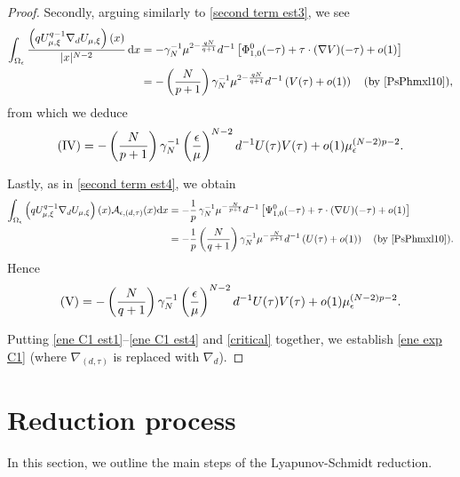 \documentclass[reqno]{amsart}
\theoremstyle{remark}
\newcommand{\ep}{\epsilon}
\newcommand{\ga}{\gamma}
\newcommand{\mca}{\mathcal{A}}
\newcommand{\dx}{\textup{d}x}
\newcommand{\mx}{{\mu,\xi}}
\renewcommand{\(}{\left(}
\renewcommand{\)}{\right)}
\numberwithin{equation}{section}
\begin{document}
\begin{proof}
Secondly, arguing similarly to \eqref{second term est3}, we see
\begin{align*}
\int_{\Omega_\ep} \frac{\(qU_\mx^{q-1}\nabla_d U_\mx\)(x)}{|x|^{N-2}}\, \dx &= -\ga_N^{-1} \mu^{2-\frac{qN}{q+1}} d^{-1} \left[\Phi_{1,0}^0(-\tau) + \tau \cdot (\nabla V)(-\tau) + o(1)\right] \\
&= -\(\frac{N}{p+1}\) \ga_N^{-1} \mu^{2-\frac{qN}{q+1}} d^{-1}\(V(\tau)+o(1)\) \quad (\textup{by \eqref{PsPhmxl10}}),
\end{align*}
from which we deduce
\begin{equation}\label{ene C1 est3}
\textup{(IV)} = -\(\frac{N}{p+1}\) \ga_N^{-1} \(\frac{\ep}{\mu}\)^{N-2} d^{-1} U(\tau)V(\tau) + o(1)\mu_\ep^{(N-2)p-2}.
\end{equation}

Lastly, as in \eqref{second term est4}, we obtain
\begin{align*}
\int_{\Omega_\ep} \(qU_\mx^{q-1}\nabla_d U_\mx\)(x)\mca_{\ep,(d,\tau)}(x) \dx &= -\frac{1}{p}\,\ga_N^{-1} \mu^{-\frac{N}{p+1}} d^{-1} \left[\Psi_{1,0}^0(-\tau) + \tau \cdot (\nabla U)(-\tau) + o(1)\right] \\
&= -\frac{1}{p}\(\frac{N}{q+1}\)\ga_N^{-1} \mu^{-\frac{N}{p+1}} d^{-1}\(U(\tau)+o(1)\) \quad (\textup{by \eqref{PsPhmxl10}}).
\end{align*}
Hence
\begin{equation}\label{ene C1 est4}
\textup{(V)} = -\(\frac{N}{q+1}\)\ga_N^{-1} \(\frac{\ep}{\mu}\)^{N-2} d^{-1} U(\tau)V(\tau) + o(1)\mu_\ep^{(N-2)p-2}.
\end{equation}

Putting \eqref{ene C1 est1}--\eqref{ene C1 est4} and \eqref{critical} together, we establish \eqref{ene exp C1} (where $\nabla_{(d,\tau)}$ is replaced with $\nabla_d$).
\end{proof}



\section{Reduction process}\label{sec LSred}
In this section, we outline the main steps of the Lyapunov-Schmidt reduction.
\end{document}
